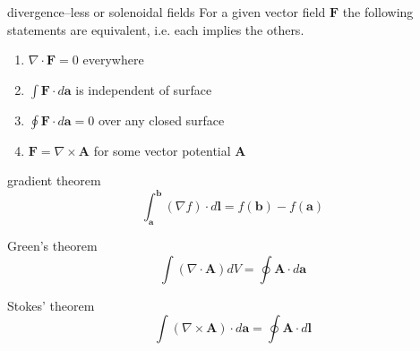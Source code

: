 \documentclass[avery5371,grid]{flashcards}
\begin{document}
\begin{flashcard}[Theorem]{divergence--less or solenoidal fields}
For a given vector field $\mathbf F$ the following statements are equivalent, i.e. each implies the others.
\begin{enumerate}
\item $\nabla \cdot \mathbf F = 0$ everywhere
\item $\int \mathbf F \cdot d \mathbf a$ is independent of surface
\item $\oint \mathbf F \cdot d \mathbf a = 0$ over any closed surface
\item $\mathbf F = \nabla \times \mathbf A$ for some vector potential $\mathbf A$
\end{enumerate}
\end{flashcard}

\begin{flashcard}[Theorem]{gradient theorem}
\begin{displaymath}
\int_{\mathbf{a}}^{\mathbf{b}} (\nabla f) \cdot d \mathbf{l} = 
f(\mathbf{b}) - f(\mathbf{a})
\end{displaymath}
\end{flashcard}

\begin{flashcard}[Theorem]{Green's theorem}
\begin{displaymath}
\int (\nabla \cdot \mathbf{A}) dV = \oint \mathbf A \cdot d \mathbf a
\end{displaymath}
\end{flashcard}

\begin{flashcard}[Theorem]{Stokes' theorem}
\begin{displaymath}
\int (\nabla \times \mathbf A) \cdot d\mathbf a = \oint \mathbf A \cdot d \mathbf l
\end{displaymath}
\end{flashcard}
\end{document}
